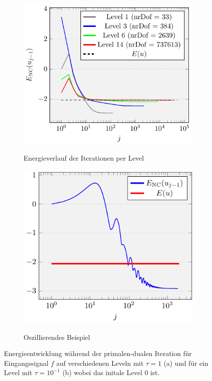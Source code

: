 \begin{figure}[p]
  \centering
  \begin{subfigure}[b]{.5\linewidth}
    \centering
    \caption{Energieverlauf der Iterationen per Level}
    \includegraphics[width=\linewidth]
      {pictures/chapExperiments/secExactSol/iteration/lvlWise/convEnergy.pdf}
    \label{fig:iterationEnergyLevel}
  \end{subfigure}
  \quad
  \begin{subfigure}[b]{.46\linewidth}
    \centering
    \caption{Oszillierendes Beispiel}
    \includegraphics[width=\linewidth]
      {pictures/chapExperiments/secExactSol/iteration/osc/convEnergy.pdf}
    \label{fig:iterationEnergyOscillations}
  \end{subfigure}
  \caption{Energieentwicklung während der primalen-dualen Iteration für
  Eingangssignal $f$ auf verschiedenen Leveln mit $\tau=1$ (a) und für ein
  Level mit $\tau=10^{-1}$ (b) wobei das initale Level 0 ist.}
  \label{fig:iterationEnergy}
\end{figure}

